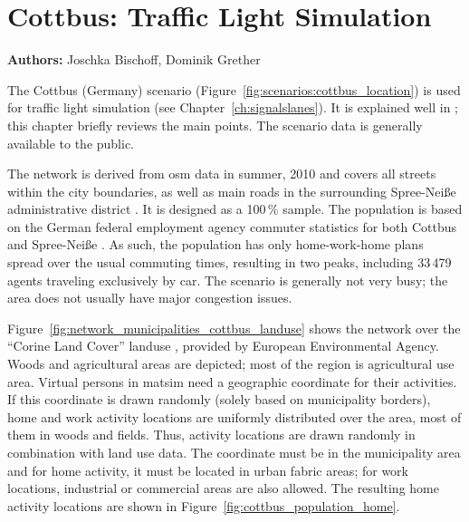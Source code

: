 \chapter{Cottbus: Traffic Light Simulation}
\label{ch:cottbus} \hfill \textbf{Authors:} Joschka Bischoff, Dominik Grether 

The Cottbus (Germany) scenario (Figure~\ref{fig:scenarios:cottbus_location}) is used for traffic light simulation (see Chapter~\ref{ch:signalslanes}). 
It is explained well in \citet[][pp.~87]{Grether_PhDThesis_2014}; this chapter briefly reviews the main points. 
The scenario data is generally available to the public.

The network is derived from \gls{osm} data in summer, 2010 \citep{Bischoff2010BaSylvia} and 
covers all streets within the city boundaries, as well as main roads in the surrounding Spree-Neiße administrative district . 
It is designed as a 100\,\% sample. 
The population is based on the German federal employment agency commuter statistics for both Cottbus and Spree-Neiße \citep{WiethoelterBogaiCarstensen2010IABPendlerberichtBB}. 
As such, the population has only home-work-home plans spread over the usual commuting times, resulting in two peaks, including 
33\,479 agents traveling exclusively by car. 
The scenario is generally not very busy; the area does not usually have major congestion issues.

Figure~\ref{fig:network_municipalities_cottbus_landuse} shows the network over the 
``Corine Land Cover'' landuse \citep{CorineLandCover2006Data}, provided by European Environmental Agency. 
Woods and agricultural areas are depicted; most of the region is agricultural use area.  
Virtual persons in \gls{matsim} need a geographic coordinate for their activities. 
If this coordinate is drawn randomly (solely based on municipality borders), home and work activity locations are uniformly distributed over  the area, \ie most of them in woods and fields. 
Thus, activity locations are drawn randomly in combination with land use data. 
The coordinate must be in the municipality area and for home activity, it must be located in urban fabric areas; for work locations, industrial or commercial areas are also allowed. 
The resulting home activity locations are shown in Figure~\ref{fig:cottbus_population_home}. 

